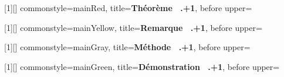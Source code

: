 [1][]{
    commonstyle=mainRed,
    title={\textbf{Théorème \faCrown \ \thechapter.\number\numexpr\thetheoreme+1\relax}},
    before upper={\inctheoreme}
}


[1][]{
    commonstyle=mainYellow,
    title={\textbf{Remarque \faExclamationTriangle \ \thechapter.\number\numexpr\theremarque+1\relax}},
    before upper={\incremarque}
}


[1][]{
    commonstyle=mainGray,
    title={\textbf{Méthode \faRoute \ \thechapter.\number\numexpr\themethode+1\relax}},
    before upper={\incmethode}
}

[1][]{
    commonstyle=mainGreen,
    title={\textbf{Démonstration \faCalculator \ \thechapter.\number\numexpr\thedemo+1\relax}},
    before upper={\incdemo}
}


\makeatletter
{}
\makeatother

\newcommand{\incdefinition}{\stepcounter{definition}}
\newcommand{\incpropriete}{\stepcounter{propriete}}
\newcommand{\incmethode}{\stepcounter{methode}}
\newcommand{\incremarque}{\stepcounter{remarque}}
\newcommand{\incexemple}{\stepcounter{exemple}}
\newcommand{\inctheoreme}{\stepcounter{theoreme}}
\newcommand{\incdemo}{\stepcounter{demo}}

\newcommand{\trous}[1]{\makebox[#1]{\rule{0pt}{1.2ex}\dotfill}}

\newcommand{\seqtitle}{}
\newcommand{\setseqtitle}[1]{\renewcommand{\seqtitle}{#1}}

